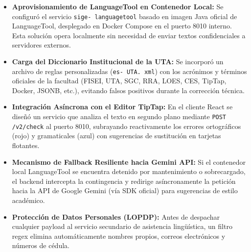 \documentclass[12pt,a4paper]{article}
\begin{document}
\begin{itemize}[leftmargin=1.5em, itemsep=4pt]
    \item \textbf{Aprovisionamiento de LanguageTool en Contenedor Local:} Se configuró el servicio \texttt{sige- languagetool} basado en imagen Java oficial de LanguageTool, desplegado en Docker Compose en el puerto 8010 interno. Esta solución opera localmente sin necesidad de enviar textos confidenciales a servidores externos.
    \item \textbf{Carga del Diccionario Institucional de la UTA:} Se incorporó un archivo de reglas personalizadas (\texttt{es- UTA. xml}) con los acrónimos y términos oficiales de la facultad (FISEI, UTA, SGC, RRA, LOES, CES, TipTap, Docker, JSONB, etc.), evitando falsos positivos durante la corrección técnica.
    \item \textbf{Integración Asíncrona con el Editor TipTap:} En el cliente React se diseñó un servicio que analiza el texto en segundo plano mediante \texttt{POST /\allowbreak  v2/\allowbreak  check} al puerto 8010, subrayando reactivamente los errores ortográficos (rojo) y gramaticales (azul) con sugerencias de sustitución en tarjetas flotantes.
    \item \textbf{Mecanismo de Fallback Resiliente hacia Gemini API:} Si el contenedor local LanguageTool se encuentra detenido por mantenimiento o sobrecargado, el backend intercepta la contingencia y redirige asíncronamente la petición hacia la API de Google Gemini (vía SDK oficial) para sugerencias de estilo académico.
    \item \textbf{Protección de Datos Personales (LOPDP):} Antes de despachar cualquier payload al servicio secundario de asistencia lingüística, un filtro regex elimina automáticamente nombres propios, correos electrónicos y números de cédula.
\end{itemize}
\end{document}
